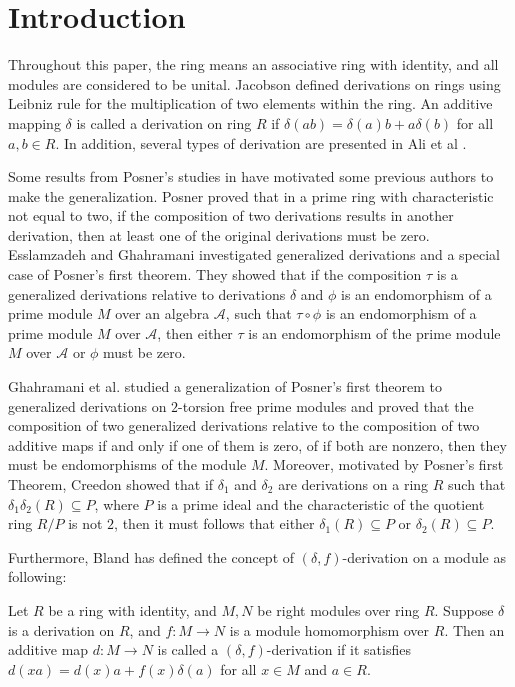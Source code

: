\documentclass{arxiv}
\begin{document}
\section{Introduction}	

Throughout this paper, the ring means an associative ring with identity, and all modules are considered to be unital. Jacobson \cite{jacobson} defined derivations on rings using Leibniz rule for the multiplication of two elements within the ring. An additive mapping $\delta$ is called a derivation on ring $R$ if $\delta (ab)=\delta (a) b + a \delta (b)$ for all $a,b \in R$. In addition, several types of derivation are presented in Ali et al \cite{shakir}.

Some results from Posner's studies in \cite{posner} have motivated some previous authors to make the generalization. Posner proved that in a prime ring with characteristic not equal to two, if the composition of two derivations results in another derivation, then at least one of the original derivations must be zero. Esslamzadeh and Ghahramani \cite{esslamzadeh} investigated generalized derivations and a special case of Posner's first theorem. They showed that if the composition $\tau$ is a generalized derivations relative to derivations $\delta$ and $\phi$ is an endomorphism of a prime module $M$ over an algebra $\mathcal{A}$, such that $\tau \circ \phi$ is an endomorphism of a prime module $M$ over $\mathcal{A}$, then either $\tau$ is an endomorphism of the prime module $M$ over $\mathcal{A}$ or $\phi$ must be zero.

Ghahramani et al. \cite{ghahramani} studied a generalization of Posner's first theorem to generalized derivations on $2$-torsion free prime modules and proved that the composition of two generalized derivations relative to the composition of two additive maps if and only if one of them is zero, of if both are nonzero, then they must be endomorphisms of the module $M$. Moreover, motivated by Posner's first Theorem, Creedon \cite{creedon} showed that if $\delta_1$ and $\delta_2$ are derivations on a ring $R$ such that $\delta_1 \delta_2 (R) \subseteq P$, where $P$ is a prime ideal and the characteristic of the quotient ring $R/P$ is not $2$, then it must follows that either $\delta_1(R) \subseteq P$ or $\delta_2 (R) \subseteq P$.

Furthermore, Bland \cite{bland} has defined the concept of $(\delta,f)$-derivation on a module as following:
\begin{definition}\label{def1.1.1} 
    Let $R$ be a ring with identity, and $M,N$ be right modules over ring $R$. Suppose $\delta$ is a derivation on $R$, and $f: M \rightarrow N$ is a module homomorphism over $R$. Then an additive map $d: M \rightarrow N$ is called a $(\delta,f)$-derivation if it satisfies $d(xa)=d(x)a+f(x)\delta(a)$ for all $x \in M$ and $a \in R$.
\end{definition}
\end{document}
